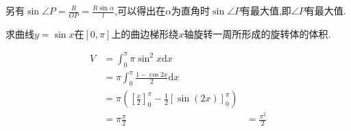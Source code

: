 \documentclass[answers]{exam}
\begin{document}
\begin{questions}
\begin{solution}
		另有$\sin\angle{P} = \frac{R}{OP} =
			\frac{R\sin\alpha}{l}$,可以得出在$\alpha$为直角时$\sin\angle{P}$有最大值,即$\angle{P}$有最大值.
	\end{solution}
	\question 求曲线$y=\sin{x}$在$[0,\pi]$上的曲边梯形绕$x$轴旋转一周所形成的旋转体的体积.
	\begin{solution}
		\begin{align*}
			V & = \int_0^{\pi}\pi \sin^2{x}\mathrm{d}x                              \\
			  & = \pi\int_0^{\pi}\frac{1-\cos{2x}}{2}\mathrm{d}x                    \\
			  & = \pi(\left[\frac{x}{2}\right]_0^{\pi} - \frac12[\sin(2x)]_0^{\pi}) \\
			  & = \pi\frac{\pi}{2}
			  & = \frac{\pi^2}{2}
		\end{align*}
	\end{solution}

\end{questions}
\end{document}
